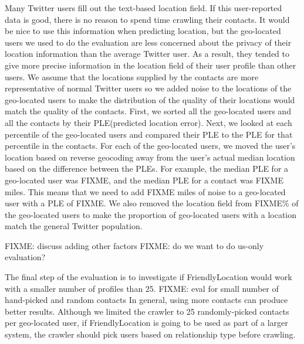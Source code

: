 Many Twitter users fill out the text-based location field.
%
If this user-reported data is good, there is no reason to spend time crawling
their contacts.
%
It would be nice to use this information when predicting location, but
the geo-located users we used to do the evaluation are less concerned about the
privacy of their location information than the average Twitter user.
%
As a result, they tended to give more precise information in the location field
of their user profile than other users.
%
We assume that the locations supplied by the contacts are more representative
of normal Twitter users so we added noise to the locations of the geo-located
users to make the distribution of the quality of their locations would match
the quality of the contacts.
%
First, we sorted all the geo-located users and all the contacts by their
PLE(predicted location error).
%
Next, we looked at each percentile of the geo-located users and compared their
PLE to the PLE for that percentile in the contacts.
%
For each of the geo-located users, we moved the user's location based on
reverse geocoding away from the user's actual median location based on the
difference between the PLEs.
%
For example, the median PLE for a geo-located user was FIXME, and the median
PLE for a contact was FIXME miles.
%
This means that we need to add FIXME miles of noise to a geo-located user with
a PLE of FIXME.
%
We also removed the location field from FIXME\% of the geo-located users to
make the proportion of geo-located users with a location match the general
Twitter population.

FIXME: discuss adding other factors
FIXME: do we want to do us-only evaluation?

The final step of the evaluation is to investigate if FriendlyLocation would
work with a smaller number of profiles than 25.
%
FIXME: eval for small number of hand-picked and random contacts
%
In general, using more contacts can produce better results.
%
Although we limited the crawler to 25 randomly-picked contacts per geo-located
user, if FriendlyLocation is going to be used as part of a larger system, the
crawler should pick users based on relationship type before crawling.




